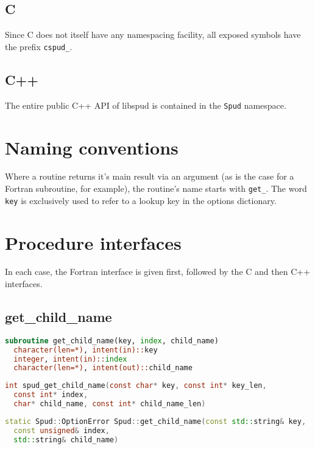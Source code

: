 \documentclass[a4paper, 11pt]{book}
\begin{document}
\subsection{C}

Since C does not itself have any namespacing facility, all exposed symbols
have the prefix \lstinline[language=C]+cspud_+.

\subsection{C++}

The entire public C++ API of libspud is contained in the
\lstinline[language=C++]+Spud+ namespace.

\section{Naming conventions}

Where a routine returns it's main result via an argument (as is the case for
a Fortran subroutine, for example), the routine's name starts with
\lstinline[language=fortran]+get_+. The word
\lstinline[language=fortran]+key+ is exclusively used to refer to a lookup key in
the options dictionary.

\section{Procedure interfaces}
\lstset{frame=single}

In each case, the Fortran interface is given first, followed by the C and
then C++ interfaces.

\subsection{get\_child\_name}

\begin{lstlisting}[language=fortran]
subroutine get_child_name(key, index, child_name)    
  character(len=*), intent(in)::key 
  integer, intent(in)::index
  character(len=*), intent(out)::child_name
\end{lstlisting}

\begin{lstlisting}[language=C]
int spud_get_child_name(const char* key, const int* key_len, 
  const int* index, 
  char* child_name, const int* child_name_len)
\end{lstlisting}

\begin{lstlisting}[language=C++]
static Spud::OptionError Spud::get_child_name(const std::string& key, 
  const unsigned& index, 
  std::string& child_name)
\end{lstlisting}
\end{document}
